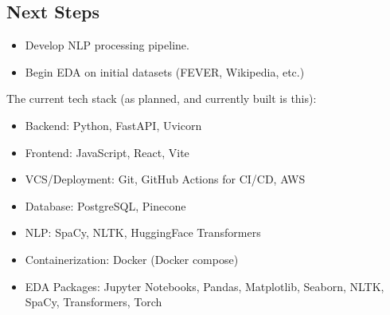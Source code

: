 \documentclass[11pt,letterpaper]{article}
\newcommand{\nextSteps}[1]{
    \subsection*{Next Steps}
    #1
}
\begin{document}
\nextSteps{
    \begin{itemize}
        \item Develop NLP processing pipeline.
        \item Begin EDA on initial datasets (FEVER, Wikipedia, etc.)
    \end{itemize}

    The current tech stack (as planned, and currently built is this):
    \begin{itemize}
        \item Backend: Python, FastAPI, Uvicorn
        \item Frontend: JavaScript, React, Vite
        \item VCS/Deployment: Git, GitHub Actions for CI/CD, AWS
        \item Database: PostgreSQL, Pinecone
        \item NLP: SpaCy, NLTK, HuggingFace Transformers
        \item Containerization: Docker (Docker compose)
        \item EDA Packages: Jupyter Notebooks, Pandas, Matplotlib, Seaborn, NLTK, SpaCy, Transformers, Torch
    \end{itemize}
}
\end{document}

